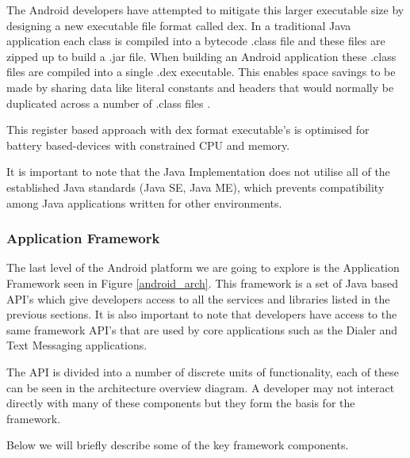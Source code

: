 The Android developers have attempted to mitigate this larger executable size by designing a new executable file format called dex. In a traditional Java application each class is compiled into a bytecode .class file and these files are zipped up to build a .jar file. When building an Android application these .class files are compiled into a single .dex executable. This enables space savings to be made by sharing data like literal constants and headers that would normally be duplicated across a number of .class files \cite{ehringerdalvik10}.

This register based approach with dex format executable’s is optimised for battery based-devices with constrained CPU and memory. 

It is important to note that the Java Implementation does not utilise all of the established Java standards (Java SE, Java ME), which prevents compatibility among Java applications written for other environments.

\subsubsection{Application Framework}
The last level of the Android platform we are going to explore is the Application Framework seen in Figure \ref{android_arch}. This framework is a set of Java based API’s which give developers access to all the services and libraries listed in the previous sections. It is also important to note that developers have access to the same framework API’s that are used by core applications such as the Dialer and Text Messaging applications.

The API is divided into a number of discrete units of functionality, each of these can be seen in the architecture overview diagram. A developer may not interact directly with many of these components but they form the basis for the framework.

Below we will briefly describe some of the key framework components.

